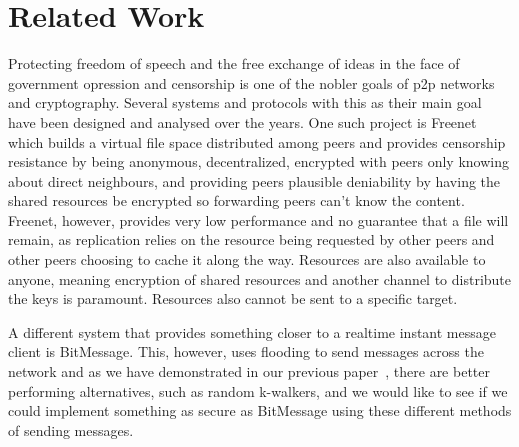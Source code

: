 \section{Related Work}
Protecting freedom of speech and the free exchange of ideas in the face of government opression and censorship is one of the nobler goals of p2p networks and cryptography. Several systems and protocols with this as their main goal have been designed and analysed over the years. One such project is Freenet~\citep{freenet} which builds a virtual file space distributed among peers and provides censorship resistance by being anonymous, decentralized, encrypted with peers only knowing about direct neighbours, and providing peers plausible deniability by having the shared resources be encrypted so forwarding peers can't know the content. Freenet, however, provides very low performance and no guarantee that a file will remain, as replication relies on the resource being requested by other peers and other peers choosing to cache it along the way. Resources are also available to anyone, meaning encryption of shared resources and another channel to distribute the keys is paramount. Resources also cannot be sent to a specific target. 

A different system that provides something closer to a realtime instant message client is BitMessage\citep{bitmessage}. This, however, uses flooding to send messages across the network and as we have demonstrated in our previous paper~\citep{P2PN}, there are better performing alternatives, such as random k-walkers, and we would like to see if we could implement something as secure as BitMessage using these different methods of sending messages.